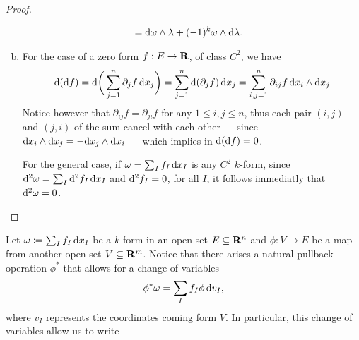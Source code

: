 \begin{proof}
\begin{enumerate}[(a)]
\begin{align*}
    &= \mathrm{d} \omega \wedge \lambda + (-1)^k \omega \wedge \mathrm{d} \lambda.
  \end{align*}
\item For the case of a zero form \(f: E \to \mathbf{R}\), of class \(C^2\), we have
  \[
    \mathrm{d}(\mathrm{d} f) =
    \mathrm{d} \bigg( \sum_{j=1}^n \partial_j f\, \mathrm{d} x_j \bigg)
    = \sum_{j = 1}^n \mathrm{d} (\partial_j f)\, \mathrm{d} x_j
    = \sum_{i, j = 1}^n \partial_{i j} f\, \mathrm{d} x_i \wedge \mathrm{d} x_j
  \]
  Notice however that \(\partial_{i j} f = \partial_{j i} f\) for any \(1 \leq
  i, j \leq n\), thus each pair \((i, j)\) and \((j, i)\) of the sum cancel with
  each other --- since \(\mathrm{d} x_i \wedge \mathrm{d} x_j = - \mathrm{d} x_j \wedge \mathrm{d}
  x_i\) --- which implies in \(\mathrm{d}(\mathrm{d} f) = 0\).

  For the general case, if \(\omega = \sum_I f_I\, \mathrm{d} x_I\) is any \(C^2\)
  \(k\)-form, since \(\mathrm{d}^2 \omega = \sum_I \mathrm{d}^2 f_I\, \mathrm{d} x_I\) and
  \(\mathrm{d}^2 f_I = 0\), for all \(I\), it follows immediatly that \(\mathrm{d}^2
  \omega = 0\).
\end{enumerate}
\end{proof}

Let \(\omega \coloneq \sum_I f_I\, \mathrm{d} x_I\) be a \(k\)-form in an open set
\(E \subseteq \mathbf{R}^n\) and \(\phi: V \to E\) be a map from another open set \(V
\subseteq \mathbf{R}^m\). Notice that there arises a natural pullback operation
\(\phi^{*}\) that allows for a change of variables
\[
  \phi^{*} \omega = \sum_I f_I \phi\, \mathrm{d} v_I,
\]
where \(v_I\) represents the coordinates coming form \(V\). In particular, this
change of variables allow us to write




